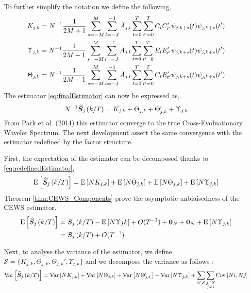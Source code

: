 \documentclass[main_document.tex]{subfiles}
\begin{document}
To further simplify the notation we define the following, 
\begin{align}
	K_{j,k} = N^{-1} \frac{\displaystyle 1}{\displaystyle 2M+1} \sum_{s=-M}^{M} \scalesum{l} \invA{j}{l} \locsum{t}\locsum{t'} C_t C_{t'}' \wavelet{j}{k+s}{t}\wavelet{j}{k+s}{t'} \label{eq:Kappa} \\
	\Upsilon_{j,k} = N^{-1} \frac{\displaystyle 1}{\displaystyle 2M+1} \sum_{s=-M}^{M} \scalesum{l} \invA{j}{l} \locsum{t}\locsum{t'} E_t E_{t'}' \wavelet{j}{k+s}{t}\wavelet{j}{k+s}{t'} \label{eq:Upsilon} \\
	\Theta_{j,k} = N^{-1} \frac{\displaystyle 1}{\displaystyle 2M+1} \sum_{s=-M}^{M} \scalesum{l} \invA{j}{l} \locsum{t}\locsum{t'} C_t E_{t'}' \wavelet{j}{k+s}{t}\wavelet{j}{k+s}{t'} \label{eq:Theta} 
\end{align}
The estimator \eqref{eq:finalEstimator} can now be expressed as, 
\begin{align}
	N^{-1} \widehat{\bm{S}}_{j}\left(k/T\right) = K_{j,k} + \Theta_{j,k} + \Theta_{j,k}' + \Upsilon_{j,k} \label{eq:redefinedEstimator}
\end{align}
From Park et al. (2014) this estimator converge to the true Cross-Evoluationary Wavelet Spectrum. The next development assert the same convergence with the estimator redefined by the factor structure. 

First, the expectation of the estimator can be decomposed thanks to \eqref{eq:redefinedEstimator},
\begin{align*}
	\mathrm{E}\left[\widehat{\bm{S}}_{j}\left(k/T\right)\right] = \mathrm{E}\left[N K_{j,k}\right] + \mathrm{E}\left[N \Theta_{j,k}\right] + \mathrm{E}\left[N \Theta_{j,k}\right] + \mathrm{E}\left[N \Upsilon_{j,k}\right]
\end{align*}
Theorem \ref{thm:CEWS_Components} prove the asymptotic unbiaisedness of the CEWS estimator.
\begin{align*}
	\mathrm{E}\left[\widehat{\bm{S}}_{j}\left(k/T\right)\right] &= \bm{S}_{j}\left(k/T\right) - \mathrm{E}\left[N\Upsilon{j}{k}\right] + O(T^{-1}) + \bm{0}_{N} + \bm{0}_{N} + \mathrm{E}\left[N \Upsilon_{j,k}\right] \\
				    &= \bm{S}_{j}\left(k/T\right) + O(T^{-1})
\end{align*}

Next, to analyse the variance of the estimator, we define $\mathcal{S} = \{ K_{j,k}, \Theta_{j,k}, \Theta_{j,k}', \Upsilon_{j,k} \}$ and we decompose the variance as follows : 
\begin{align}
	\Var{\estimCEWS{j}{k}} = \Var{N K_{j,k}} + \Var{N \Theta_{j,k}} + \Var{N \Theta_{j,k}'} + \Var{N \Upsilon_{j,k}} + \sum_{i \in \mathcal{S}} \sum_{\substack{j \in \mathcal{S} \\ j \neq i}} \Cov{Ni}{N j}
\end{align}
\end{document}
